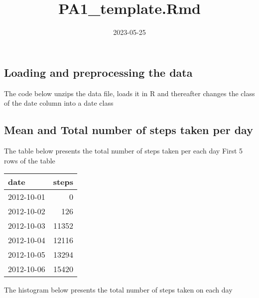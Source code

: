 \documentclass[
]{article}
\title{PA1\_template.Rmd}
\author{}
\date{\vspace{-2.5em}2023-05-25}
\newenvironment{Shaded}{\begin{snugshade}}{\end{snugshade}}
\newcommand{\AttributeTok}[1]{\textcolor[rgb]{0.77,0.63,0.00}{#1}}
\newcommand{\FunctionTok}[1]{\textcolor[rgb]{0.00,0.00,0.00}{#1}}
\newcommand{\NormalTok}[1]{#1}
\newcommand{\OtherTok}[1]{\textcolor[rgb]{0.56,0.35,0.01}{#1}}
\newcommand{\SpecialCharTok}[1]{\textcolor[rgb]{0.00,0.00,0.00}{#1}}
\newcommand{\StringTok}[1]{\textcolor[rgb]{0.31,0.60,0.02}{#1}}
\begin{document}
\maketitle

\hypertarget{loading-and-preprocessing-the-data}{%
\subsection{Loading and preprocessing the
data}\label{loading-and-preprocessing-the-data}}

The code below unzips the data file, loads it in R and thereafter
changes the class of the date column into a date class

\begin{Shaded}
\end{Shaded}

\hypertarget{mean-and-total-number-of-steps-taken-per-day}{%
\subsection{Mean and Total number of steps taken per
day}\label{mean-and-total-number-of-steps-taken-per-day}}

The table below presents the total number of steps taken per each day
First 5 rows of the table

\begin{longtable}[]{@{}lr@{}}
\toprule()
date & steps \\
\midrule()
\endhead
2012-10-01 & 0 \\
2012-10-02 & 126 \\
2012-10-03 & 11352 \\
2012-10-04 & 12116 \\
2012-10-05 & 13294 \\
2012-10-06 & 15420 \\
\bottomrule()
\end{longtable}

The histogram below presents the total number of steps taken on each day
\end{document}
